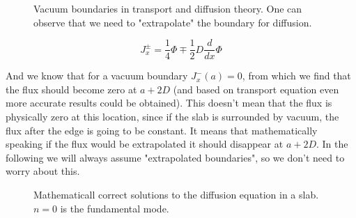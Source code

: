\begin{figure}[ht!]
\protect {}\protect
\caption{\label{fig:boundary} \footnotesize{Vacuum boundaries in transport and diffusion theory. One can observe that we need to "extrapolate" the boundary for diffusion.}}
\end{figure} 


\[
J_x^\pm=\frac{1}{4}\Phi\mp\frac{1}{2}D\frac{d}{dx}\Phi
\]

And we know that for a vacuum boundary $J_x^-(a)=0$, from which we find that the flux should become zero at $a+2D$ (and based on transport equation even more accurate results could be obtained). This doesn't mean that the flux is physically zero at this location, since if the slab is surrounded by vacuum, the flux after the edge is going to be constant. It means that mathematically speaking if the flux would be extrapolated it should disappear at $a+2D$. In the following we will always assume "extrapolated boundaries", so we don't need to worry about this.

\begin{figure}[ht!]
\protect {}\protect
\caption{\label{fig:multislab} \footnotesize{Mathematicall correct solutions to the diffusion equation in a slab. $n=0$ is the fundamental mode.}}
\end{figure} 


